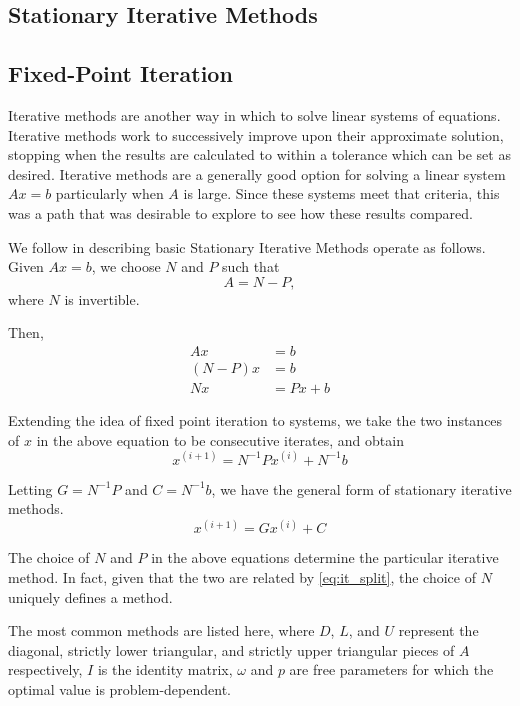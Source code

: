 \documentclass[10pt]{article}
\newcommand{\iter}[1]{^{(#1)}}
\begin{document}
\begin{multicols}{2}
\section{Stationary Iterative Methods}
\subsection{Fixed-Point Iteration}
Iterative methods are another way in which to solve linear systems of equations.
Iterative methods work to successively improve upon their approximate solution, stopping when the results are calculated to within a tolerance which can be set as desired.
Iterative methods are a generally good option for solving a linear system $Ax=b$ particularly when $A$ is large.
Since these systems meet that criteria, this was a path that was desirable to explore to see how these results compared.


We follow \citet[Section 1.1]{anderson_analysis_2012} in describing basic Stationary Iterative Methods operate as follows.
Given $Ax = b$, we choose $N$ and $P$ such that 
\begin{equation}
	A = N-P,
	\label{eq:it_split}
\end{equation}
where $N$ is invertible.

Then,
\begin{align*}
    Ax &= b \\
    (N-P)x &= b \\
    Nx &= Px + b
\end{align*}

Extending the idea of fixed point iteration to systems, we take the two instances of $x$ in the above equation to be consecutive iterates, and obtain
\begin{equation}
    x\iter{i+1} = N^{-1}Px\iter{i} + N^{-1}b
    \label{eq:it_np}
\end{equation}

Letting $G=N^{-1}P$ and $C=N^{-1}b$, we have the general form of stationary iterative methods.
\begin{equation}
    x\iter{i+1} = Gx\iter{i} + C
    \label{eq:it_g}
\end{equation}

The choice of $N$ and $P$ in the above equations determine the particular iterative method.
In fact, given that the two are related by \eqref{eq:it_split}, the choice of $N$ uniquely defines a method.

The most common methods are listed here, where $D$, $L$, and $U$ represent the diagonal, strictly lower triangular, and strictly upper triangular pieces of $A$ respectively, $I$ is the identity matrix, $\omega$ and $p$ are free parameters for which the optimal value is problem-dependent.


\end{multicols}
\end{document}
